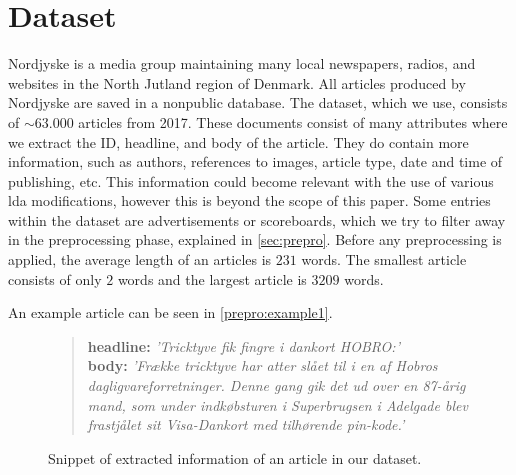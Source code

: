\section{Dataset}\label{sec:dataset}
Nordjyske is a media group maintaining many local newspapers, radios, and websites in the North Jutland region of Denmark.
All articles produced by Nordjyske are saved in a nonpublic database.
The dataset, which we use, consists of $\sim$$63.000$ articles from 2017.
These documents consist of many attributes where we extract the ID, headline, and body of the article.
They do contain more information, such as authors, references to images, article type, date and time of publishing, etc.
This information could become relevant with the use of various \gls{lda} modifications, however this is beyond the scope of this paper.
Some entries within the dataset are advertisements or scoreboards, which we try to filter away in the preprocessing phase, explained in \autoref{sec:prepro}.
Before any preprocessing is applied, the average length of an articles is $231$ words.
The smallest article consists of only $2$ words and the largest article is $3209$ words.

An example article can be seen in \autoref{prepro:example1}.

\begin{figure}[h]
	\begin{framed}
		\begin{quote}
			\textbf{headline:} \textit{'Tricktyve fik fingre i dankort HOBRO:'}\\
			\textbf{body:} \textit{'Frække tricktyve har atter slået til i en af Hobros dagligvareforretninger. Denne gang gik det ud over en 87-årig mand, som under indkøbsturen i Superbrugsen i Adelgade blev frastjålet sit Visa-Dankort med tilhørende pin-kode.'}
		\end{quote}
	\end{framed}
		\caption{Snippet of extracted information of an article in our dataset.}
		\label{prepro:example1}
\end{figure}
